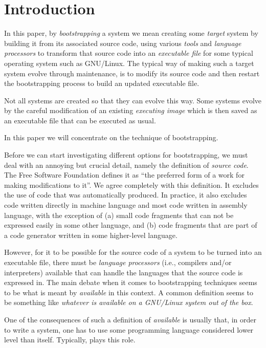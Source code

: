 \section{Introduction}
\label{sec-introduction}

In this paper, by \emph{bootstrapping} a \commonlisp{} system we mean
creating some \emph{target} \commonlisp{} system by building it from
its associated source code, using various \emph{tools} and
\emph{language processors} to transform that source code into an
\emph{executable file} for some typical operating system such as
GNU/Linux.  The typical way of making such a target \commonlisp{}
system evolve through maintenance, is to modify its source code and
then restart the bootstrapping process to build an updated executable
file.

Not all \commonlisp{} systems are created so that they can evolve this
way.  Some systems evolve by the careful modification of an existing
\emph{executing image} which is then saved as an executable file that
can be executed as usual.

In this paper we will concentrate on the technique of bootstrapping.

Before we can start investigating different options for bootstrapping,
we must deal with an annoying but crucial detail, namely the
definition of \emph{source code}.  The Free Software Foundation
defines it as ``the preferred form of a work for making modifications
to it''.  We agree completely with this definition.  It excludes the
use of code that was automatically produced.  In practice, it also
excludes code written directly in machine language and most code
written in assembly language, with the exception of (a) small code
fragments that can not be expressed easily in some other language, and
(b) code fragments that are part of a code generator written in some
higher-level language.

However, for it to be possible for the source code of a \commonlisp{}
system to be turned into an executable file, there must be
\emph{language processors} (i.e., compilers and/or interpreters)
available that can handle the languages that the source code is
expressed in.  The main debate when it comes to bootstrapping
techniques seems to be what is meant by \emph{available} in this
context.  A common definition seems to be something like
\emph{whatever is available on a GNU/Linux system out of the box}.

One of the consequences of such a definition of \emph{available} is
usually that, in order to write a \commonlisp{} system, one has to use
some programming language considered lower level than \commonlisp{}
itself.  Typically, \clanguage{} plays this role.

